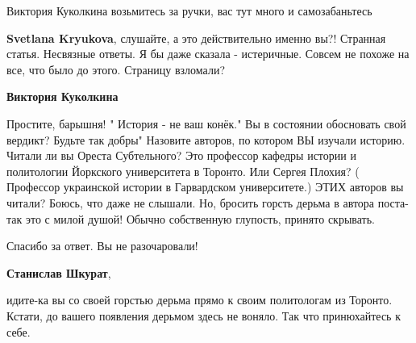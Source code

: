 \begin{itemize}
\begin{itemize}
Виктория Куколкина возьмитесь за ручки, вас тут много и самозабаньтесь

 
\textbf{Svetlana Kryukova}, слушайте, а это действительно именно вы?! Странная статья. Несвязные ответы. Я бы даже сказала - истеричные. Совсем не похоже на все, что было до этого. Страницу взломали?

 
\textbf{Виктория Куколкина}

Простите, барышня! " История - не ваш конёк." Вы в состоянии обосновать свой
вердикт? Будьте так добры" Назовите авторов, по котором ВЫ изучали историю.
Читали ли вы Ореста Субтельного? Это профессор кафедры истории и политологии
Йоркского университета в Торонто. Или Сергея Плохия? ( Профессор украинской
истории в Гарвардском университете.) ЭТИХ авторов вы читали? Боюсь, что даже не
слышали. Но, бросить горсть дерьма в автора поста-так это с милой душой! Обычно
собственную глупость, принято скрывать.


 
Спасибо за ответ. Вы не разочаровали!

 
\textbf{Станислав Шкурат}, 

идите-ка вы со своей горстью дерьма прямо к своим политологам из Торонто.
Кстати, до вашего появления дерьмом здесь не воняло. Так что принюхайтесь к
себе.

 

\end{itemize}
\end{itemize}
